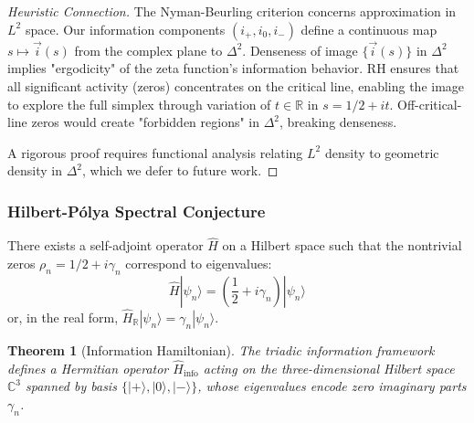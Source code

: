 \documentclass[12pt]{article}
\theoremstyle{plain}
\newtheorem{theorem}{Theorem}[section]
\theoremstyle{definition}
\begin{document}
\begin{proof}[Heuristic Connection]
The Nyman-Beurling criterion concerns approximation in $L^2$ space. Our information components $(i_+, i_0, i_-)$ define a continuous map $s \mapsto \vec{i}(s)$ from the complex plane to $\Delta^2$. Denseness of image $\{\vec{i}(s)\}$ in $\Delta^2$ implies "ergodicity" of the zeta function's information behavior. RH ensures that all significant activity (zeros) concentrates on the critical line, enabling the image to explore the full simplex through variation of $t \in \mathbb{R}$ in $s = 1/2 + it$. Off-critical-line zeros would create "forbidden regions" in $\Delta^2$, breaking denseness.

A rigorous proof requires functional analysis relating $L^2$ density to geometric density in $\Delta^2$, which we defer to future work.
\end{proof}

\subsubsection{Hilbert-Pólya Spectral Conjecture}

\begin{conjecture}
There exists a self-adjoint operator $\hat{H}$ on a Hilbert space such that the nontrivial zeros $\rho_n = 1/2 + i\gamma_n$ correspond to eigenvalues:
$$\hat{H} |\psi_n \rangle = \left(\frac{1}{2} + i\gamma_n\right) |\psi_n \rangle$$
or, in the real form, $\hat{H}_{\mathbb{R}} |\psi_n \rangle = \gamma_n |\psi_n \rangle$.
\end{conjecture}

\begin{theorem}[Information Hamiltonian]\label{thm:info_hamiltonian}
The triadic information framework defines a Hermitian operator $\hat{H}_{\text{info}}$ acting on the three-dimensional Hilbert space $\mathbb{C}^3$ spanned by basis $\{|+\rangle, |0\rangle, |-\rangle\}$, whose eigenvalues encode zero imaginary parts $\gamma_n$.
\end{theorem}
\end{document}
